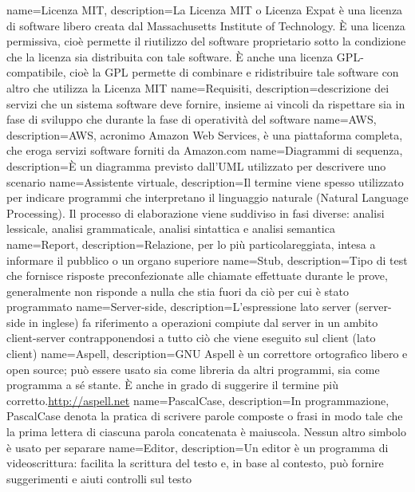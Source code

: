  {
	name=Licenza MIT,
	description={La Licenza MIT  o Licenza Expat è una licenza di software libero creata dal Massachusetts Institute of Technology. È una licenza permissiva, cioè permette il riutilizzo del software proprietario sotto la condizione che la licenza sia distribuita con tale software. È anche una licenza GPL-compatibile, cioè la GPL permette di combinare e ridistribuire tale software con altro che utilizza la Licenza MIT}
}
 {
	name=Requisiti,
	description={descrizione dei servizi che un sistema software deve fornire, insieme ai vincoli da rispettare sia in fase di sviluppo che durante la fase di operatività del software}
}
 {
	name=AWS,
	description={AWS, acronimo Amazon Web Services, è una piattaforma completa, che eroga servizi software forniti da Amazon.com}
}
 {
	name=Diagrammi di sequenza,
	description={È un diagramma previsto dall'UML utilizzato per descrivere uno scenario}
}
 {
	name=Assistente virtuale,
	description={Il termine viene spesso utilizzato per indicare programmi che interpretano il linguaggio naturale (Natural Language Processing). Il processo di elaborazione viene suddiviso in fasi diverse: analisi lessicale, analisi grammaticale, analisi sintattica e analisi semantica}
}
 {
	name=Report,
	description={Relazione, per lo più particolareggiata, intesa a informare il pubblico o un organo superiore}
}
 {
	name=Stub,
	description={Tipo di test che fornisce risposte preconfezionate alle chiamate effettuate durante le prove, generalmente non risponde a nulla che stia fuori da ciò per cui è stato programmato}
}
 {
	name=Server-side,
	description={L'espressione lato server (server-side in inglese) fa riferimento a operazioni compiute dal server in un ambito client-server contrapponendosi a tutto ciò che viene eseguito sul client (lato client)}
}
 {
	name=Aspell,
	description={GNU Aspell è un correttore ortografico libero e open source; può essere usato sia come libreria da altri programmi, sia come programma a sé stante. È anche in grado di suggerire il termine più corretto.\url{http://aspell.net}}
}
 {
	name=PascalCase,
	description={In programmazione, PascalCase denota la pratica di scrivere parole composte o frasi in modo tale che la prima lettera di ciascuna parola concatenata è maiuscola. Nessun altro simbolo è usato per separare}
}
 {
	name=Editor,
	description={Un editor è un programma di videoscrittura: facilita la scrittura del testo e, in base al contesto, può fornire suggerimenti e aiuti controlli sul testo}
}
